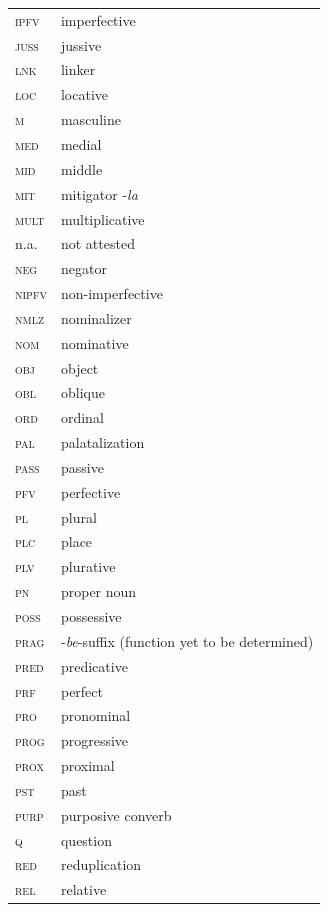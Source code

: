 \documentclass[output=paper,colorlinks,citecolor=brown,draftmode
]{langscibook}
\begin{document}
\begin{tabularx}{.45\textwidth}{lQ}
\textsc{ipfv} &	imperfective\\
\textsc{juss} & jussive\\
\textsc{lnk} & linker\\
\textsc{loc} &	locative\\
\textsc{m} & masculine\\
\textsc{med} & medial \\
\textsc{mid} & middle\\
\textsc{mit} & mitigator -\textit{la}\\
\textsc{mult} & multiplicative\\
n.a. & not attested\\
\textsc{neg} & negator\\
\textsc{nipfv} & non-imperfective\\
\textsc{nmlz} & nominalizer\\
\textsc{nom} &	nominative\\
\textsc{obj} &	object\\
\textsc{obl} &	oblique\\
\textsc{ord} & ordinal\\
\textsc{pal} & palatalization\\
\textsc{pass} &	passive\\
\textsc{pfv} &	perfective\\
\textsc{pl} &	plural\\
\textsc{plc} & place\\
\textsc{plv} & plurative \\
\textsc{pn} & proper noun\\
\textsc{poss} &	possessive\\
\textsc{prag} & -\textit{be}-suffix (function yet to be determined)\\
\textsc{pred} &	predicative\\
\textsc{prf} &	perfect\\
\textsc{pro} & pronominal\\
\textsc{prog} &	progressive\\
\textsc{prox} & proximal \\
\textsc{pst} & past \\
\textsc{purp} &	purposive converb\\
\textsc{q} & question\\
\textsc{red} & reduplication\\
\textsc{rel} &	relative\\
\end{tabularx}
\end{document}
